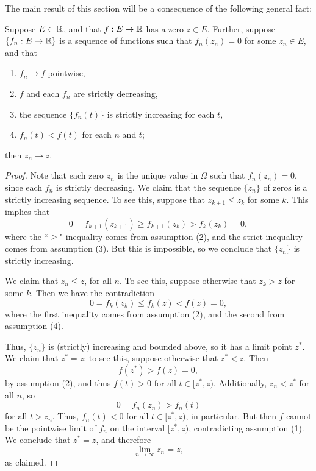The main result of this section will be a consequence of the following general fact:

\begin{lemma} \label{th:zeroconv}
	Suppose $E \subset \mathbb{R}$, and that $f:E \to \mathbb{R}$ has a zero $z \in E$. Further, suppose $\{f_n:E \to \mathbb{R}\}$ is a sequence of functions such that $f_n(z_n) = 0$ for some $z_n \in E$, and that
	\begin{enumerate}
		\item $f_n \to f$ pointwise,
		\item $f$ and each $f_n$ are strictly decreasing,
		\item the sequence $\{f_n(t)\}$ is strictly increasing for each $t$,
		\item $f_n(t) < f(t)$ for each $n$ and $t$;
	\end{enumerate}
then $z_n \to z$.
\end{lemma}

\begin{proof}
	Note that each zero $z_n$ is the unique value in $\Omega$ such that $f_n(z_n) = 0$, since each $f_n$ is strictly decreasing. We claim that the sequence $\{z_n\}$ of zeros is a strictly increasing sequence. To see this, suppose that $z_{k + 1} \leq z_k$ for some $k$. This implies that
	\[0 = f_{k+1}(z_{k+1}) \geq f_{k+1}(z_k) > f_k(z_k) = 0,\]
	where the ``$\geq$" inequality comes from assumption (2), and the strict inequality comes from assumption (3). But this is impossible, so we conclude that $\{z_n\}$ is strictly increasing.
	
	We claim that $z_n \leq z$, for all $n$. To see this, suppose otherwise that $z_k > z$ for some $k$. Then we have the contradiction
	\[0 = f_k(z_k) \leq f_k(z) < f(z) = 0,\]
	where the first inequality comes from assumption (2), and the second from assumption (4).
	
	Thus, $\{z_n\}$ is (strictly) increasing and bounded above, so it has a limit point $z^*$. We claim that $z^* = z$; to see this, suppose otherwise that $z^* < z$. Then
	\[f(z^*) > f(z) = 0,\]
	by assumption (2), and thus $f(t) > 0$ for all $t \in [z^*, z)$. Additionally, $z_n < z^*$ for all $n$, so
	\[0 = f_n(z_n) > f_n(t)\]
	for all $t > z_n$. Thus, $f_n(t) < 0$ for all $t \in [z^*, z)$, in particular. But then $f$ cannot be the pointwise limit of $f_n$ on the interval $[z^*, z)$, contradicting assumption (1). We conclude that $z^* = z$, and therefore
	\[\lim_{n \to \infty} z_n = z,\]
	as claimed.
\end{proof}


